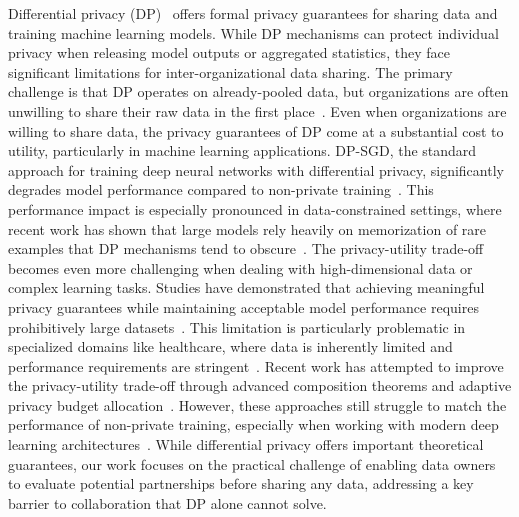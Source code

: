 Differential privacy (DP)~\cite{dwork2006differential} offers formal privacy guarantees for sharing data and training machine learning models. While DP mechanisms can protect individual privacy when releasing model outputs or aggregated statistics, they face significant limitations for inter-organizational data sharing. The primary challenge is that DP operates on already-pooled data, but organizations are often unwilling to share their raw data in the first place~\cite{dwork2014algorithmic}.
Even when organizations are willing to share data, the privacy guarantees of DP come at a substantial cost to utility, particularly in machine learning applications. DP-SGD, the standard approach for training deep neural networks with differential privacy, significantly degrades model performance compared to non-private training~\cite{abadi2016deep}. This performance impact is especially pronounced in data-constrained settings, where recent work has shown that large models rely heavily on memorization of rare examples that DP mechanisms tend to obscure~\cite{feldman2020neural}.
The privacy-utility trade-off becomes even more challenging when dealing with high-dimensional data or complex learning tasks. Studies have demonstrated that achieving meaningful privacy guarantees while maintaining acceptable model performance requires prohibitively large datasets~\cite{bagdasaryan2020backdoor}. This limitation is particularly problematic in specialized domains like healthcare, where data is inherently limited and performance requirements are stringent~\cite{geyer2017differentially}.
Recent work has attempted to improve the privacy-utility trade-off through advanced composition theorems and adaptive privacy budget allocation~\cite{papernot2021tempered}. However, these approaches still struggle to match the performance of non-private training, especially when working with modern deep learning architectures~\cite{tramer2020differentially}. While differential privacy offers important theoretical guarantees, our work focuses on the practical challenge of enabling data owners to evaluate potential partnerships before sharing any data, addressing a key barrier to collaboration that DP alone cannot solve.

 